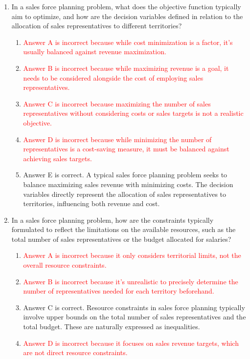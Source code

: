 \documentclass{article}%
\newcommand{\incorrect}[1]{\textcolor{red}{#1}}
\begin{document}
\begin{enumerate}%
\item In a sales force planning problem, what does the objective function typically aim to optimize, and how are the decision variables defined in relation to the allocation of sales representatives to different territories?%
\begin{enumerate}%
\item \incorrect{Answer A is incorrect because while cost minimization is a factor, it's usually balanced against revenue maximization.}%
\item \incorrect{Answer B is incorrect because while maximizing revenue is a goal, it needs to be considered alongside the cost of employing sales representatives.}%
\item \incorrect{Answer C is incorrect because maximizing the number of sales representatives without considering costs or sales targets is not a realistic objective.}%
\item \incorrect{Answer D is incorrect because while minimizing the number of representatives is a cost-saving measure, it must be balanced against achieving sales targets.}%
\item Answer E is correct.  A typical sales force planning problem seeks to balance maximizing sales revenue with minimizing costs. The decision variables directly represent the allocation of sales representatives to territories, influencing both revenue and cost.%
\end{enumerate}%
\vspace{1em}%
\item In a sales force planning problem, how are the constraints typically formulated to reflect the limitations on the available resources, such as the total number of sales representatives or the budget allocated for salaries?%
\begin{enumerate}%
\item \incorrect{Answer A is incorrect because it only considers territorial limits, not the overall resource constraints.}%
\item \incorrect{Answer B is incorrect because it's unrealistic to precisely determine the number of representatives needed for each territory beforehand.}%
\item Answer C is correct.  Resource constraints in sales force planning typically involve upper bounds on the total number of sales representatives and the total budget. These are naturally expressed as inequalities.%
\item \incorrect{Answer D is incorrect because it focuses on sales revenue targets, which are not direct resource constraints.}%

\end{enumerate}
\end{enumerate}
\end{document}

